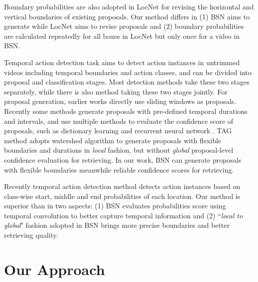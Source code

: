 \documentclass[runningheads]{llncs}
\begin{document}
Boundary probabilities are also adopted in LocNet \cite{gidaris2016locnet} for revising the horizontal and vertical boundaries of existing proposals. Our method differs in (1) BSN aims to generate while LocNet aims to revise proposals and (2) boundary probabilities are calculated repeatedly for all boxes  in LocNet but only once for a video  in BSN.


Temporal action detection task aims to detect action instances in untrimmed videos including temporal boundaries and action classes, and can be divided into proposal and classification stages.
Most detection methods \cite{shou2016action,singh2016untrimmed,zhao2017temporal} take these two stages separately, while there is also method \cite{ssad,sstad} taking these two stages jointly.
For proposal generation, earlier works \cite{karaman2014fast,oneata2014lear,wang2014action} directly use sliding windows as proposals. Recently some methods \cite{sst_buch_cvpr17,fast_temporal_activity_cvpr16,escorcia2016daps,gao2017turn,shou2016action} generate proposals with  pre-defined temporal durations and intervals, and use multiple methods to evaluate the confidence score of proposals, such as dictionary learning \cite{fast_temporal_activity_cvpr16} and recurrent neural network \cite{escorcia2016daps}.
TAG method \cite{zhao2017temporal} adopts watershed algorithm to generate proposals with flexible boundaries and durations in \emph{local} fashion, but without \emph{global} proposal-level confidence evaluation for retrieving. %
In our work, BSN can generate proposals with flexible boundaries meanwhile reliable confidence scores for retrieving.

Recently temporal action detection method \cite{yuan2017temporal} detects action instances based on class-wise start, middle and end probabilities of each location. Our method is superior than \cite{yuan2017temporal} in two aspects: (1) BSN evaluates probabilities score using temporal convolution to better capture temporal information  and (2) ``\emph{local to global}" fashion adopted in BSN brings more precise boundaries and better retrieving quality.



\section{Our Approach}
\end{document}
